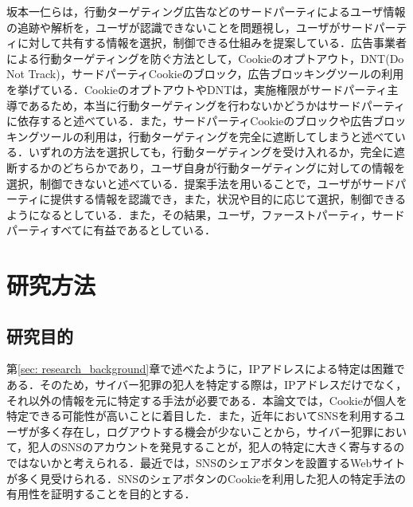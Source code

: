 \documentclass[10pt, a4paper]{jreport}
\begin{document}
坂本一仁らは，行動ターゲティング広告などのサードパーティによるユーザ情報の追跡や解析を，ユーザが認識できないことを問題視し，ユーザがサードパーティに対して共有する情報を選択，制御できる仕組みを提案している\cite{relevant_research_first_party_third_party}．広告事業者による行動ターゲティングを防ぐ方法として，Cookieのオプトアウト，DNT(Do Not Track)，サードパーティCookieのブロック，広告ブロッキングツールの利用を挙げている．CookieのオプトアウトやDNTは，実施権限がサードパーティ主導であるため，本当に行動ターゲティングを行わないかどうかはサードパーティに依存すると述べている．また，サードパーティCookieのブロックや広告ブロッキングツールの利用は，行動ターゲティングを完全に遮断してしまうと述べている．いずれの方法を選択しても，行動ターゲティングを受け入れるか，完全に遮断するかのどちらかであり，ユーザ自身が行動ターゲティングに対しての情報を選択，制御できないと述べている．提案手法を用いることで，ユーザがサードパーティに提供する情報を認識でき，また，状況や目的に応じて選択，制御できるようになるとしている．また，その結果，ユーザ，ファーストパーティ，サードパーティすべてに有益であるとしている．












\chapter{研究方法}
\section{研究目的}

第\ref{sec: research_background}章で述べたように，IPアドレスによる特定は困難である．そのため，サイバー犯罪の犯人を特定する際は，IPアドレスだけでなく，それ以外の情報を元に特定する手法が必要である．本論文では，Cookieが個人を特定できる可能性が高いことに着目した．また，近年においてSNSを利用するユーザが多く存在し，ログアウトする機会が少ないことから，サイバー犯罪において，犯人のSNSのアカウントを発見することが，犯人の特定に大きく寄与するのではないかと考えられる．最近では，SNSのシェアボタンを設置するWebサイトが多く見受けられる．SNSのシェアボタンのCookieを利用した犯人の特定手法の有用性を証明することを目的とする．
\end{document}

